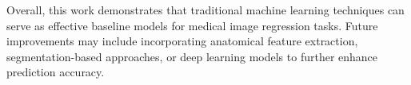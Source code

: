 \documentclass{IEEEtran}
\begin{document}
Overall, this work demonstrates that traditional machine learning techniques can serve as effective baseline models for medical image regression tasks. Future improvements may include incorporating anatomical feature extraction, segmentation-based approaches, or deep learning models to further enhance prediction accuracy.
\end{document}

